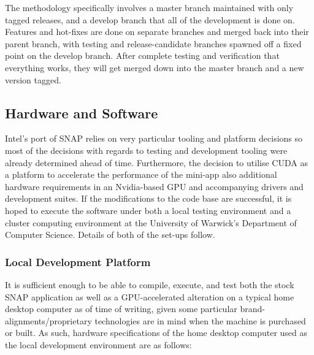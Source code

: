 \documentclass[conference]{IEEEtran}
\begin{document}
The methodology specifically involves a master branch maintained with only tagged releases, and a develop branch that all of the development is done on. Features and hot-fixes are done on separate branches and merged back into their parent branch, with testing and release-candidate branches spawned off a fixed point on the develop branch. After complete testing and verification that everything works, they will get merged down into the master branch and a new version tagged.

\subsection{Hardware and Software}

Intel's port of SNAP relies on very particular tooling and platform decisions so most of the decisions with regards to testing and development tooling were already determined ahead of time. Furthermore, the decision to utilise CUDA as a platform to accelerate the performance of the mini-app also additional hardware requirements in an Nvidia-based GPU and accompanying drivers and development suites. If the modifications to the code base are successful, it is hoped to execute the software under both a local testing environment and a cluster computing environment at the University of Warwick's Department of Computer Science. Details of both of the set-ups follow.

\subsubsection{Local Development Platform}
\label{subsubsec:projmgmt_localtesting}

It is sufficient enough to be able to compile, execute, and test both the stock SNAP application as well as a GPU-accelerated alteration on a typical home desktop computer as of time of writing, given some particular brand-alignments/proprietary technologies are in mind when the machine is purchased or built. As such, hardware specifications of the home desktop computer used as the local development environment are as follows:
\end{document}
